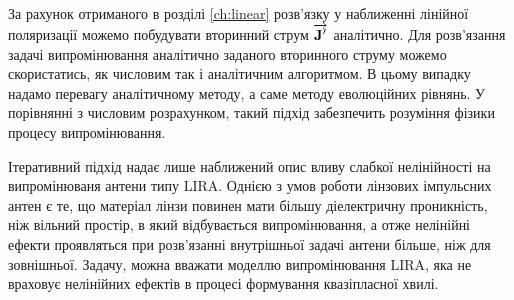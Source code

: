 За рахунок отриманого в розділі \ref{ch:linear} розв'язку у наближенні 
лінійної поляризації можемо побудувати вторинний струм $ \overrightarrow{\mathbf J^\prime} $
аналітично. Для розв'язання задачі випромінювання аналітично заданого 
вторинного струму можемо скористатись, як числовим так і аналітичним 
алгоритмом. В цьому випадку надамо перевагу аналітичному методу, а саме 
методу еволюційних рівнянь. У порівнянні з числовим розрахунком, такий підхід
забезпечить розуміння фізики процесу випромінювання.

Ітеративний підхід надає лише наближений опис вливу слабкої нелінійності на
випромінюваня антени типу LIRA. Однією з умов роботи лінзових імпульсних 
антен є те, що матеріал лінзи повинен мати більшу діелектричну проникність, 
ніж вільний простір, в який відбувається випромінювання, а отже нелінійні 
ефекти проявляться при розв'язанні внутрішньої задачі антени більше, ніж 
для зовнішньої. Задачу, можна вважати моделлю випромінювання LIRA, яка 
не враховує нелінійних ефектів в процесі формування квазіпласної хвилі.

